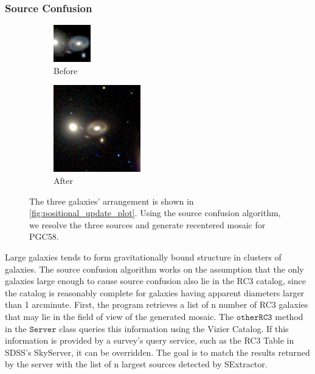\documentclass[5p]{elsarticle}
\begin{document}
	\subsubsection{Source Confusion}
\begin{figure}
\begin{subfigure}{.2\textwidth}
\centering
  \includegraphics[width=.5\linewidth ]{figures/PGC58b4SC}
  \caption{Before}
\end{subfigure}%
\begin{subfigure}{.2\textwidth}
\centering
  \includegraphics[width=.5\linewidth]{figures/PGC58afterSC}
  \caption{After} 
\end{subfigure}
\caption{ The three galaxies' arrangement is shown in \autoref{fig:positional_update_plot}. Using the source confusion algorithm, we resolve the three sources and generate recentered mosaic for PGC58.}
\label{fig:SCdemo}
\end{figure}
\indent Large galaxies tends to form gravitationally bound structure in clusters of galaxies. The source confusion algorithm works on the assumption that the only galaxies large enough to cause source confusion also lie in the RC3 catalog, since the catalog is reasonably complete for galaxies having apparent diameters larger than 1 arcminute. First, the program retrieves a list of n number of RC3 galaxies that may lie in the field of view of the generated mosaic. The $\texttt{otherRC3}$ method in the $\texttt{Server}$ class queries this information using the Vizier Catalog. If this information is provided by a survey's query service, such as the RC3 Table in SDSS's SkyServer, it can be overridden. The goal is to match the results returned by the server with the list of n largest sources detected by SExtractor. 
\end{document}
